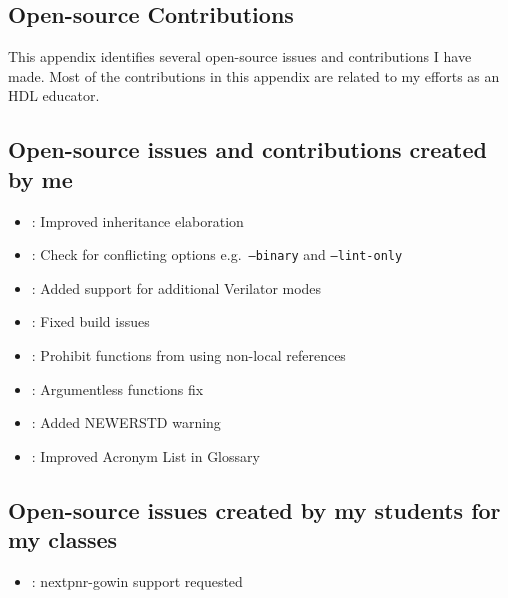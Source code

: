 
\begin{appendices}



\chapter{Open-source Contributions}
\label{appx:contributions}

This appendix identifies several open-source issues and contributions I have made.
Most of the contributions in this appendix are related to my efforts as an HDL educator.

\section{Open-source issues and contributions created by me}

\begin{itemize}
    \item [\mergedicon] : Improved inheritance elaboration
    \item [\mergedicon] : Check for conflicting options e.g.\ \texttt{--binary} and \texttt{--lint-only}
    \item [\pullrequesticon] : Added support for additional Verilator modes
    \item [\mergedicon] : Fixed build issues
    \item [\mergedicon] : Prohibit functions from using non-local references
    \item [\mergedicon] : Argumentless functions fix
    \item [\mergedicon] : Added NEWERSTD warning
    \item [\mergedicon] : Improved Acronym List in Glossary
\end{itemize}

\section{Open-source issues created by my students for my classes}

\begin{itemize}
    \item [\issueclosedicon] : nextpnr-gowin support requested
\end{itemize}




\end{appendices}
